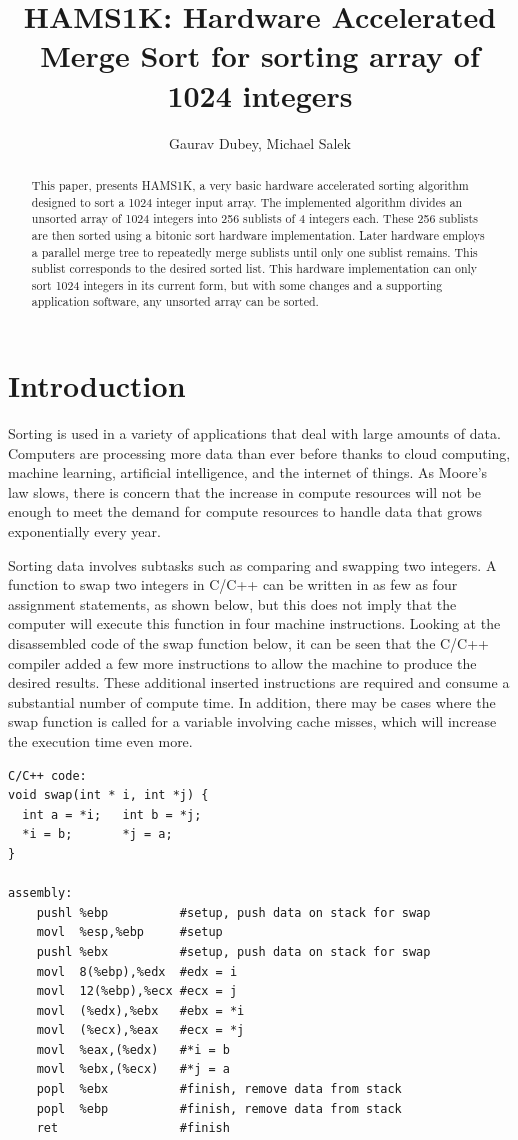 \documentclass{article}
\title{HAMS1K: Hardware Accelerated Merge Sort for sorting array of 1024 integers}
\author{Gaurav Dubey, Michael Salek}
\begin{document}
\maketitle

\begin{abstract}
This paper, presents HAMS1K, a very basic hardware accelerated sorting algorithm designed to sort a 1024 integer input array. The implemented algorithm divides an unsorted array of 1024 integers into 256 sublists of 4 integers each. These 256 sublists are then sorted using a bitonic sort hardware implementation. Later hardware employs a parallel merge tree to repeatedly merge sublists until only one sublist remains. This sublist corresponds to the desired sorted list. This hardware implementation can only sort 1024 integers in its current form, but with some changes and a supporting application software, any unsorted array can be sorted. 
\end{abstract}

\section{Introduction}

Sorting is used in a variety of applications that deal with large amounts of data. Computers are processing more data than ever before thanks to cloud computing, machine learning, artificial intelligence, and the internet of things. As Moore's law slows, there is concern that the increase in compute resources will not be enough to meet the demand for compute resources to handle data that grows exponentially every year.

Sorting data involves subtasks such as comparing and swapping two integers. A function to swap two integers in C/C++ can be written in as few as four assignment statements, as shown below, but this does not imply that the computer will execute this function in four machine instructions. Looking at the disassembled code of the swap function below, it can be seen that the C/C++ compiler added a few more instructions to allow the machine to produce the desired results. These additional inserted instructions are required and consume a substantial number of compute time. In addition, there may be cases where the swap function is called for a variable involving cache misses, which will increase the execution time even more. 


\begin{lstlisting}
C/C++ code:
void swap(int * i, int *j) {
  int a = *i;   int b = *j;
  *i = b;       *j = a;
}

assembly:
    pushl %ebp          #setup, push data on stack for swap
    movl  %esp,%ebp     #setup
    pushl %ebx          #setup, push data on stack for swap
    movl  8(%ebp),%edx  #edx = i
    movl  12(%ebp),%ecx #ecx = j
    movl  (%edx),%ebx   #ebx = *i
    movl  (%ecx),%eax   #ecx = *j
    movl  %eax,(%edx)   #*i = b
    movl  %ebx,(%ecx)   #*j = a
    popl  %ebx          #finish, remove data from stack
    popl  %ebp          #finish, remove data from stack
    ret                 #finish
\end{lstlisting}
\end{document}
